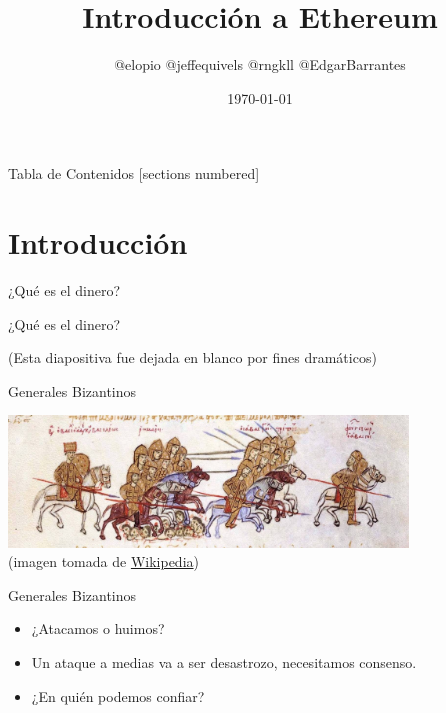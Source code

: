\documentclass[10pt]{beamer}
\title{Introducción a Ethereum}
\date{\today}
\author{@elopio @jeffequivels @rngkll @EdgarBarrantes}
\institute{JáquerEspeis}
\begin{document}
\maketitle

\begin{frame}{Tabla de Contenidos}
  [sections numbered]
  \tableofcontents[hideallsubsections]
\end{frame}

\section{Introducción}

\begin{frame}{¿Qué es el dinero?}
  
\end{frame}

\begin{frame}{¿Qué es el dinero?}

  (Esta diapositiva fue dejada en blanco por fines dramáticos)
  
\end{frame}

\begin{frame}{Generales Bizantinos}

  \begin{center}
    \includegraphics[height=3.5cm]{images/generales-bizantinos.jpg}
    \\ (imagen tomada de \href{https://commons.wikimedia.org/w/index.php?title=File:Skylitzes._Basil_II_vs_Georgians_cropped.jpg&oldid=181584464}{Wikipedia})
  \end{center}
  
\end{frame}

\begin{frame}{Generales Bizantinos}

  \begin{itemize}
    \item ¿Atacamos o huimos?
    \item Un ataque a medias va a ser desastrozo, necesitamos consenso.
    \item ¿En quién podemos confiar?
  \end{itemize}
  
\end{frame}
\end{document}

